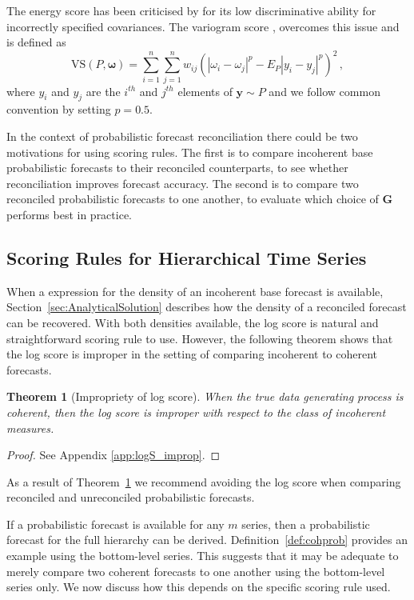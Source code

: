 \documentclass[12pt]{article}
\newtheorem{theo}{Theorem}[section]
\theoremstyle{definition}
\begin{document}
The energy score has been criticised by \citet{Pinson2013a} for its low discriminative ability for incorrectly specified covariances.  The variogram score  \citep{SCHEUERER2015}, overcomes this issue and is defined as
\begin{equation*}
\text{VS}({P}, \bm{\omega}) = \displaystyle\sum_{i=1}^{n}\displaystyle\sum_{j=1}^{n}w_{ij}\left(|\omega_{i} - \omega_{j}|^p - E_{P} |{y}_{i}-{y}_{j}|^p\right)^2\,,
\end{equation*}
where $y_i$ and $y_j$ are the $i^{th}$ and $j^{th}$ elements of $\bm{y}\sim P$ and we follow common convention by setting $p=0.5$.

In the context of probabilistic forecast reconciliation there could be two motivations for using scoring rules. The first is to compare incoherent base probabilistic forecasts to their reconciled counterparts, to see whether reconciliation improves forecast accuracy. The second is to compare two reconciled probabilistic forecasts to one another, to evaluate which choice of $\bm{G}$ performs best in practice.

\subsection{Scoring Rules for Hierarchical Time Series}

When a expression for the density of an incoherent base forecast is available, Section~\ref{sec:AnalyticalSolution} describes how the density of a reconciled forecast can be recovered.  With both densities available, the log score is natural and straightforward scoring rule to use.  However, the following theorem shows that the log score is improper in the setting of comparing incoherent to coherent forecasts.

\begin{theo}[Impropriety of log score]\label{theo:logS_improp}
	When the true data generating process is coherent, then the log score is improper with respect to the class of incoherent measures.
\end{theo}

\begin{proof}
	See Appendix \ref{app:logS_improp}.
\end{proof}

As a result of Theorem~\ref{theo:logS_improp} we recommend avoiding the log score when comparing reconciled and unreconciled probabilistic forecasts.

If a probabilistic forecast is available for any $m$ series, then a probabilistic forecast for the full hierarchy can be derived.  Definition~\ref{def:cohprob} provides an example using the bottom-level series. This suggests that it may be adequate to merely compare two coherent forecasts to one another using the bottom-level series only. We now discuss how this depends on the specific scoring rule used.
\end{document}

